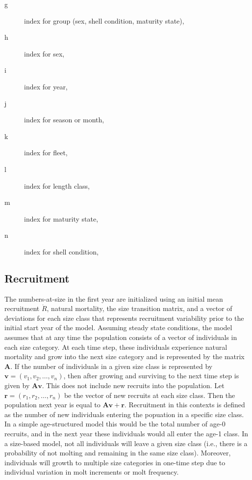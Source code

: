 \begin{description}
	\item [g] index for group (sex, shell condition, maturity state),
	\item [h] index for sex,
	\item [i] index for year,
	\item [j] index for season or month,
	\item [k] index for fleet,
	\item [l] index for length class,
	\item [m] index for maturity state,
	\item [n] index for shell condition,
\end{description}


\subsection{Recruitment} %
\label{sub:recruitment}
The numbers-at-size in the first year are initialized using an initial mean recruitment $\dot{R}$, natural mortality, the size transition matrix, and a vector of deviations for each size class that represents recruitment variability prior to the initial start year of the model.  Assuming steady state conditions, the model assumes that at any time the population consists of a vector of individuals in each size category. At each time step, these individuals experience natural mortality and grow into the next size category and is represented by the matrix $\boldsymbol{A}$. If the number of individuals in a given size class is represented by $\boldsymbol{v}=(v_1,v_2,\ldots,v_n)$, then after growing and surviving to the next time step is given by $\boldsymbol{A}\boldsymbol{v}$.  This does not include new recruits into the population. Let $\boldsymbol{r}= (r_1, r_2, \ldots, r_n)$ be the vector of new recruits at each size class. Then the population next year is equal to $\boldsymbol{A}\boldsymbol{v} + \boldsymbol{r}$.  Recruitment in this contexts is defined as the number of new individuals entering the popuation in a specific size class.  In a simple age-structured model this would be the total number of age-0 recruits, and in the next year these individuals would all enter the age-1 class.  In a size-based model, not all individuals will leave a given size class (i.e., there is a probability of not molting and remaining in the same size class).   Moreover, individuals will growth to multiple size categories in one-time step due to individual variation in molt increments or molt frequency.

